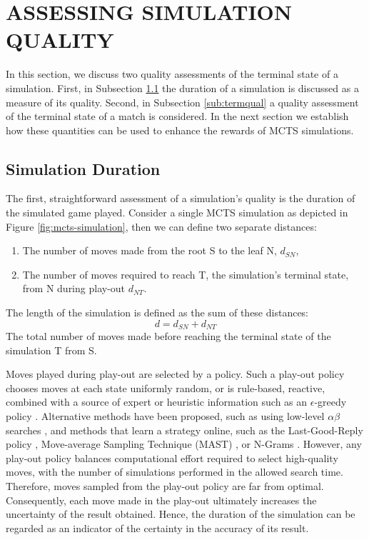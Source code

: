 \documentclass{ecai2014}
\newcommand{\node}[1]{{\fontfamily{phv}\selectfont#1}}
\begin{document}
\section{ASSESSING SIMULATION QUALITY}
\label{sec:poqual}
In this section, we discuss two quality assessments of the terminal state of a simulation. First, in Subsection \ref{sub:simdur} the duration of a simulation is discussed as a measure of its quality. Second, in Subsection \ref{sub:termqual} a quality assessment of the terminal state of a match is considered. In the next section we establish how these quantities can be used to enhance the rewards of MCTS simulations. 

\subsection{Simulation Duration} 
\label{sub:simdur}
The first, straightforward assessment of a simulation's quality is the duration of the simulated game played. Consider a single MCTS simulation as depicted in Figure \ref{fig:mcts-simulation}, then we can define two separate distances: 
\begin{enumerate}
\item The number of moves made from the root \node{S} to the leaf \node{N}, $d_{SN}$,
\item The number of moves required to reach \node{T}, the simulation's terminal state, from \node{N} during play-out $d_{NT}$.
\end{enumerate}
The length of the simulation is defined as the sum of these distances:
\begin{equation}
d = d_{SN} + d_{NT}
\label{eq:m_ST}
\end{equation}
The total number of moves made before reaching the terminal state of the simulation \node{T} from \node{S}.

Moves played during play-out are selected by a policy. Such a play-out policy chooses moves at each state uniformly random, or is rule-based, reactive, combined with a source of expert or heuristic information such as an $\epsilon$-greedy policy \cite{sturtevant2008analysis, sutton1998reinforcement}. Alternative methods have been proposed, such as using low-level $\alpha\beta$ searches \cite{Winands2011}, and methods that learn a strategy online, such as the Last-Good-Reply policy \cite{baier2010power}, Move-average Sampling Technique (MAST) \cite{finnsson2008simulation}, or N-Grams \cite{Tak2012}. However, any play-out policy balances computational effort required to select high-quality moves, with the number of simulations performed in the allowed search time. Therefore, moves sampled from the play-out policy are far from optimal. Consequently, each move made in the play-out ultimately increases the uncertainty of the result obtained. Hence, the duration of the simulation can be regarded as an indicator of the certainty in the accuracy of its result.
\end{document}
